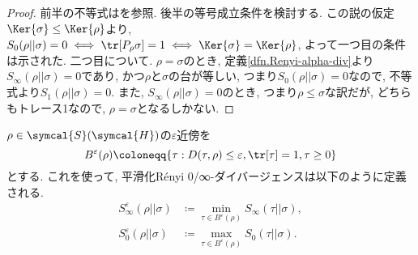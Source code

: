 \begin{proof}
  前半の不等式は\cite{SagawaEntropy}を参照. 
  後半の等号成立条件を検討する. 
  この説の仮定$\Ker{\sigma}\leq\Ker{\rho}$より, $S_0(\rho||\sigma)=0\iff \tr[P_{\rho}\sigma]=1\iff \Ker{\sigma}=\Ker{\rho}$, よって一つ目の条件は示された. 
  二つ目について. 
  $\rho=\sigma$のとき, 定義\ref{dfn.Renyi-alpha-div}より$S_{\infty}(\rho||\sigma)=0$であり, かつ$\rho$と$\sigma$の台が等しい, つまり$S_0(\rho||\sigma)=0$なので, 不等式より$S_1(\rho||\sigma)=0$. 
  また, $S_{\infty}(\rho||\sigma)=0$のとき, つまり$\rho\leq\sigma$な訳だが, どちらもトレース1なので, $\rho=\sigma$となるしかない. 
\end{proof}

\begin{mydfn}\label{dfn.smoothed_Renyi-alpha-div}
  $\rho\in\symcal{S}(\symcal{H})$の$\varepsilon$近傍を
  \begin{equation}
    B^{\varepsilon}(\rho)\coloneqq \{\tau: D(\tau, \rho)\leq \varepsilon, \tr[\tau]=1, \tau\geq 0\}
  \end{equation}
  とする. 
  これを使って, 平滑化R\'{e}nyi 0/∞-ダイバージェンスは以下のように定義される. 
  \begin{align}
    S_{\infty}^{\varepsilon}(\rho||\sigma)&\coloneqq \min_{\tau\in B^{\varepsilon}(\rho)}S_{\infty}(\tau||\sigma), \label{dfn.smoothed_Renyi_infty_div}\\
    S_{0}^{\varepsilon}(\rho||\sigma)&\coloneqq \max_{\tau\in B^{\varepsilon}(\rho)}S_{0}(\tau||\sigma). \label{dfn.smoothed_Renyi_0_div}
  \end{align}
\end{mydfn}
